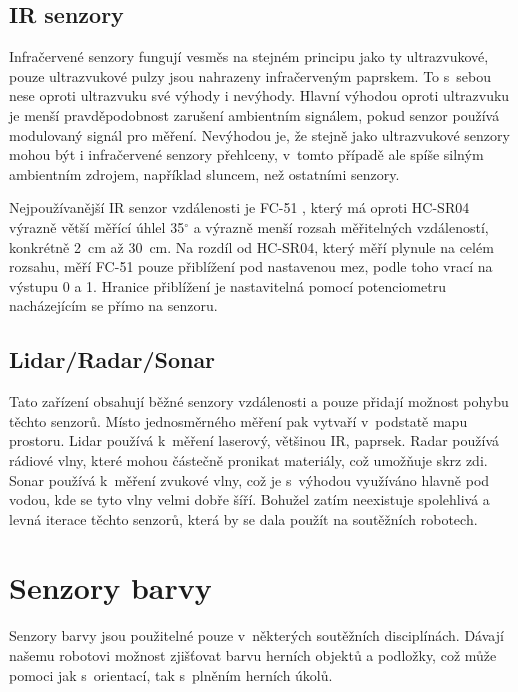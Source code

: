 \subsection{IR senzory}
Infračervené senzory fungují vesměs na stejném principu jako ty ultrazvukové, pouze ultrazvukové pulzy jsou nahrazeny infračerveným paprskem.
To s~sebou nese oproti ultrazvuku své výhody i nevýhody.
Hlavní výhodou oproti ultrazvuku je menší pravděpodobnost zarušení ambientním signálem, pokud senzor používá modulovaný signál pro měření. 
Nevýhodou je, že stejně jako ultrazvukové senzory mohou být i infračervené senzory přehlceny, v~tomto případě ale spíše silným ambientním zdrojem, například sluncem, než ostat\-ní\-mi senzory.

Nejpoužívanější IR senzor vzdálenosti je FC-51 \cite{fc-51}, který má oproti HC-SR04 výrazně větší měřící úhlel 35$^{\circ}$ a výrazně menší rozsah měřitelných vzdáleností, konkrétně 2~cm až 30~cm.
Na rozdíl od HC-SR04, který měří plynule na celém rozsahu, měří FC-51 pouze přiblížení pod nastavenou mez, podle toho vrací na výstupu 0 a 1.
Hranice přiblížení je nastavitelná pomocí potenciometru nacházejícím se přímo na senzoru.


\subsection{Lidar/Radar/Sonar}
Tato zařízení obsahují běžné senzory vzdálenosti a pouze přidají možnost pohybu těchto senzorů. 
Místo jednosměrného měření pak vytvaří v~podstatě mapu prostoru.
Lidar používá k~měření laserový, většinou IR, paprsek.
Radar používá rádiové vlny, které mohou částečně pronikat materiály, což umožňuje  skrz zdi.
Sonar používá k~měření zvukové vlny, což je s~výhodou využíváno hlavně pod vodou, kde se tyto vlny velmi dobře šíří.
Bohužel zatím neexistuje spolehlivá a levná iterace těchto senzorů, která by se dala použít na soutěžních robotech.

\section{Senzory barvy}
Senzory barvy jsou použitelné pouze v~některých soutěžních disciplínách.
Dávají našemu robotovi možnost zjišťovat barvu herních objektů a podložky, což může pomoci jak s~orientací, tak s~plněním herních úkolů.

